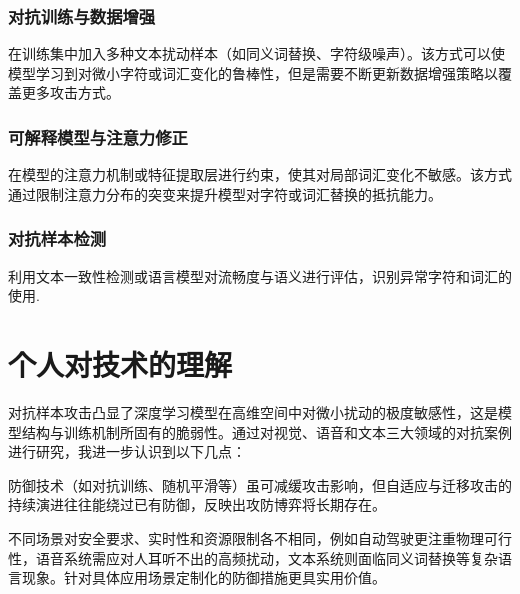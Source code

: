 \documentclass[main]{IEEEtran}
\begin{document}
\subsubsection{对抗训练与数据增强}
在训练集中加入多种文本扰动样本（如同义词替换、字符级噪声）\cite{jones2020robust}。该方式可以使模型学习到对微小字符或词汇变化的鲁棒性，但是需要不断更新数据增强策略以覆盖更多攻击方式。

\subsubsection{可解释模型与注意力修正}
在模型的注意力机制或特征提取层进行约束，使其对局部词汇变化不敏感\cite{wang2021infobert}。该方式通过限制注意力分布的突变来提升模型对字符或词汇替换的抵抗能力。

\subsubsection{对抗样本检测}
利用文本一致性检测或语言模型对流畅度与语义进行评估，识别异常字符和词汇的使用\cite{mozes2021freq}.

\section{个人对技术的理解}
\songti
对抗样本攻击凸显了深度学习模型在高维空间中对微小扰动的极度敏感性，这是模型结构与训练机制所固有的脆弱性。通过对视觉、语音和文本三大领域的对抗案例进行研究，我进一步认识到以下几点：

防御技术（如对抗训练、随机平滑等）虽可减缓攻击影响，但自适应与迁移攻击的持续演进往往能绕过已有防御，反映出攻防博弈将长期存在。

不同场景对安全要求、实时性和资源限制各不相同，例如自动驾驶更注重物理可行性，语音系统需应对人耳听不出的高频扰动，文本系统则面临同义词替换等复杂语言现象。针对具体应用场景定制化的防御措施更具实用价值。







\end{document}
